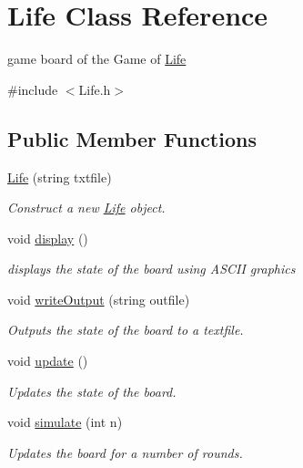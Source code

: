 \hypertarget{class_life}{}\section{Life Class Reference}
\label{class_life}


game board of the Game of \hyperlink{class_life}{Life}  




{\ttfamily \#include $<$Life.\+h$>$}

\subsection*{Public Member Functions}
\begin{DoxyCompactItemize}
\item 
\hyperlink{class_life_ace91fdfb133e871271c6cdb3a01e5438}{Life} (string txtfile)
\begin{DoxyCompactList}\small\item\em Construct a new \hyperlink{class_life}{Life} object. \end{DoxyCompactList}\item 
\mbox{\label{class_life_a2e6962f96645207bcbe3c43fd026edaa}} 
void \hyperlink{class_life_a2e6962f96645207bcbe3c43fd026edaa}{display} ()
\begin{DoxyCompactList}\small\item\em displays the state of the board using A\+S\+C\+II graphics \end{DoxyCompactList}\item 
void \hyperlink{class_life_a83a5761ba56c11bd7d559c8206b10b29}{write\+Output} (string outfile)
\begin{DoxyCompactList}\small\item\em Outputs the state of the board to a textfile. \end{DoxyCompactList}\item 
\mbox{\label{class_life_a0e00f2735584f3ddebb397742b520d3b}} 
void \hyperlink{class_life_a0e00f2735584f3ddebb397742b520d3b}{update} ()
\begin{DoxyCompactList}\small\item\em Updates the state of the board. \end{DoxyCompactList}\item 
void \hyperlink{class_life_ac71f4324936fa163457e65c9c699bca7}{simulate} (int n)
\begin{DoxyCompactList}\small\item\em Updates the board for a number of rounds. \end{DoxyCompactList}\end{DoxyCompactItemize}


